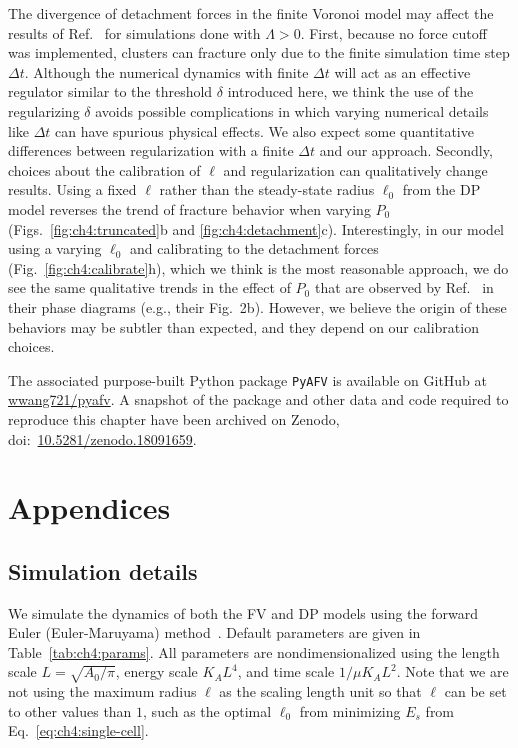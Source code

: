 The divergence of detachment forces in the finite Voronoi model may affect the results of Ref.~\cite{huang2023bridging} for simulations done with $\Lambda > 0$.
First, because no force cutoff was implemented, clusters can fracture only due to the finite simulation time step $\Delta t$. Although the numerical dynamics with finite $\Delta t$ will act as an effective regulator similar to the threshold $\delta$ introduced here, we think the use of the regularizing $\delta$ avoids possible complications in which varying numerical details like $\Delta t$ can have spurious physical effects. We also expect some quantitative differences between regularization with a finite $\Delta t$ and our approach.
Secondly, choices about the calibration of $\ell$ and regularization can qualitatively change results. Using a fixed $\ell$ rather than the steady-state radius $\ell_0$ from the DP model reverses the trend of fracture behavior when varying $P_0$ (Figs.~\ref{fig:ch4:truncated}b and \ref{fig:ch4:detachment}c).
Interestingly, in our model using a varying $\ell_0$ and calibrating to the detachment forces (Fig.~\ref{fig:ch4:calibrate}h), which we think is the most reasonable approach, we do see the same qualitative trends in the effect of $P_0$ that are observed by Ref.~\cite{huang2023bridging} in their phase diagrams (e.g., their Fig.~2b). However, we believe the origin of these behaviors may be subtler than expected, and they depend on our calibration choices.

The associated purpose-built Python package \texttt{PyAFV} is available on GitHub at \href{https://github.com/wwang721/pyafv}{wwang721/pyafv}. A snapshot of the package and other data and code required to reproduce this chapter have been archived on Zenodo, doi:~\href{https://doi.org/10.5281/zenodo.18091659}{10.5281/zenodo.18091659}.


\section{Appendices}
\label{sec:ch4:appendices}

\subsection{Simulation details}

We simulate the dynamics of both the FV and DP models using the forward Euler (Euler-Maruyama) method~\cite{kloeden1992stochastic}.
Default parameters are given in Table~\ref{tab:ch4:params}. All parameters are nondimensionalized using the length scale $L=\sqrt{A_0/\pi}$, energy scale $K_A L^4$, and time scale $1/\mu K_A L^2$.
Note that we are not using the maximum radius $\ell$ as the scaling length unit so that $\ell$ can be set to other values than $1$, such as the optimal $\ell_0$ from minimizing $E_s$ from Eq.~\eqref{eq:ch4:single-cell}.

